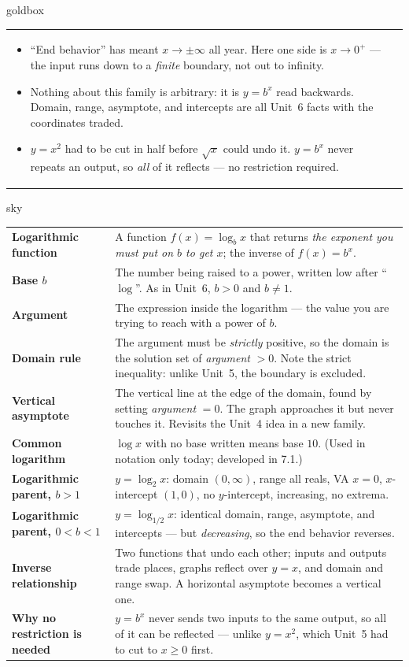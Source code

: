 \documentclass[10pt]{article}
\begin{document}
\begin{skillbox}{goldbox}
\begin{tabularx}{\linewidth}{@{}X|X@{}}
\begin{itemize}[leftmargin=1.1em, nosep, after=\vspace{2pt}]
  \item ``End behavior'' has meant $x\to\pm\infty$ all year. Here one side is $x\to 0^{+}$ --- the input runs down to a \emph{finite} boundary, not out to infinity.
  \item Nothing about this family is arbitrary: it is $y=b^x$ read backwards. Domain, range, asymptote, and intercepts are all Unit~6 facts with the coordinates traded.
  \item $y=x^2$ had to be cut in half before $\sqrt{x}$ could undo it. $y=b^x$ never repeats an output, so \emph{all} of it reflects --- no restriction required.
\end{itemize}
\end{tabularx}
\end{skillbox}

\begin{skillbox}{sky}
\renewcommand{\arraystretch}{1.3}
\begin{tabularx}{\linewidth}{@{}l X@{}}
\textbf{Logarithmic function} & A function $f(x)=\log_b x$ that returns \emph{the exponent you must put on $b$ to get $x$}; the inverse of $f(x)=b^x$. \\
\textbf{Base $b$} & The number being raised to a power, written low after ``$\log$''. As in Unit~6, $b>0$ and $b\ne1$. \\
\textbf{Argument} & The expression inside the logarithm --- the value you are trying to reach with a power of $b$. \\
\textbf{Domain rule} & The argument must be \emph{strictly} positive, so the domain is the solution set of \emph{argument} $>0$. Note the strict inequality: unlike Unit~5, the boundary is excluded. \\
\textbf{Vertical asymptote} & The vertical line at the edge of the domain, found by setting \emph{argument} $=0$. The graph approaches it but never touches it. Revisits the Unit~4 idea in a new family. \\
\textbf{Common logarithm} & $\log x$ with no base written means base $10$. (Used in notation only today; developed in 7.1.) \\
\textbf{Logarithmic parent, $b>1$} & $y=\log_2 x$: domain $(0,\infty)$, range all reals, VA $x=0$, $x$-intercept $(1,0)$, no $y$-intercept, increasing, no extrema. \\
\textbf{Logarithmic parent, $0<b<1$} & $y=\log_{1/2} x$: identical domain, range, asymptote, and intercepts --- but \emph{decreasing}, so the end behavior reverses. \\
\textbf{Inverse relationship} & Two functions that undo each other; inputs and outputs trade places, graphs reflect over $y=x$, and domain and range swap. A horizontal asymptote becomes a vertical one. \\
\textbf{Why no restriction is needed} & $y=b^x$ never sends two inputs to the same output, so all of it can be reflected --- unlike $y=x^2$, which Unit~5 had to cut to $x\ge0$ first. \\
\end{tabularx}
\end{skillbox}
\end{document}
